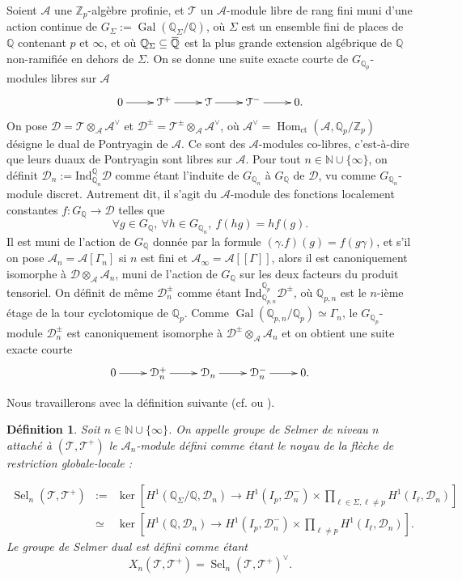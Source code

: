 \documentclass[12pt]{amsart}
\newcommand\bN{\mathbb{N}}
\newcommand\bQ{\mathbb{Q}}
\newcommand\Zp{{\mathbb{Z}_{p}}}
\newcommand\Qp{\mathbb{Q}_{p}}
\newcommand\cA{\mathcal{A}}
\newcommand\cD{\mathcal{D}}
\newcommand\cT{\mathcal{T}}
\newcommand{\ob}[1]{\mkern 1.5mu\overline{\mkern-1.5mu#1\mkern-1.5mu}\mkern 1.5mu}
\newcommand{\Ind}{\mathrm{Ind}}
\DeclareMathOperator{\Gal}{Gal}
\DeclareMathOperator{\Hom}{Hom}
\DeclareMathOperator{\Sel}{Sel}
\theoremstyle{defstyle}
\newtheorem{definition}[subsubsection]{Définition}
\theoremstyle{thmstyle}
\begin{document}
Soient $\cA$ une $\Zp$-algèbre profinie, et $\cT$ un $\cA$-module libre de rang fini muni d'une action continue de $G_\Sigma:=\Gal(\bQ_\Sigma/\bQ)$, où $\Sigma$ est un ensemble fini de places de $\bQ$ contenant $p$ et $\infty$, et où $\bQ_\Sigma \subseteq \ob{\bQ}$ est la plus grande extension algébrique de $\bQ$ non-ramifiée en dehors de $\Sigma$. On se donne une suite exacte courte de $G_{\Qp}$-modules libres sur $\cA$
$$\xymatrix{
	0 \ar[r] & \cT^+ \ar[r] & \cT \ar[r] & \cT^- \ar[r] & 0.
}
$$
On pose $\cD=\cT \otimes_{\cA} {\cA}^\vee$ et $\cD^\pm = \cT^\pm \otimes_{\cA} {\cA}^\vee$, où $\cA^\vee=\Hom_\textrm{ct}(\cA,\Qp/\Zp)$ désigne le dual de Pontryagin de $\cA$. Ce sont des $\cA$-modules co-libres, c'est-à-dire que leurs duaux de Pontryagin sont libres sur $\cA$. Pour tout $n \in \bN \cup\{\infty\}$, on définit $\cD_n:=\Ind_{{\bQ_n}}^{{\bQ}} \cD$ comme étant l'induite de $G_{\bQ_n}$ à $G_{\bQ}$ de $\cD$, vu comme $G_{\bQ_n}$-module discret. Autrement dit, il s'agit du $\cA$-module des fonctions localement constantes $f : G_{\bQ} \longrightarrow \cD$ telles que 
$$\forall g\in G_{\bQ}, \ \forall h \in G_{\bQ_n}, \ f(hg)=hf(g).$$ 
Il est muni de l'action de $G_{\bQ}$ donnée par la formule $(\gamma.f)(g)=f(g\gamma)$, et s'il on pose $\cA_n=\cA[\Gamma_n]$ si $n$ est fini et $\cA_\infty=\cA[[\Gamma]]$, alors il est canoniquement isomorphe à $\cD \otimes_{\cA} \cA_n$, muni de l'action de $G_{\bQ}$ sur les deux facteurs du produit tensoriel. On définit de même $\cD_n^\pm$ comme étant $\Ind_{{\bQ_{p,n}}}^{{\bQ_p}} \cD^\pm$, où $\bQ_{p,n}$ est le $n$-ième étage de la tour cyclotomique de $\Qp$. Comme $\Gal(\bQ_{p,n}/\Qp)\simeq\Gamma_n$, le $G_{\Qp}$-module $\cD_n^\pm$ est canoniquement isomorphe à $\cD^\pm \otimes_{\cA} \cA_n$ et on obtient une suite exacte courte
$$\xymatrix{
	0 \ar[r] & \cD_n^+ \ar[r] & \cD_n \ar[r] & \cD_n^- \ar[r] & 0.
}
$$

Nous travaillerons avec la définition suivante (cf. \cite[Section 3]{skinner2014iwasawa} ou \cite{greenberg2015structure}).

\begin{definition}\label{Selgen}
	Soit $n\in \bN \cup\{\infty\}$. On appelle groupe de Selmer de niveau $n$ attaché à $(\cT,\cT^+)$ le $\cA_n$-module défini comme étant le noyau de la flèche de restriction globale-locale : 
	
	\[\begin{array}{rcl} \Sel_n(\cT,\cT^+)
	&:=&\ker \left[ H^1(\bQ_\Sigma/\bQ,\cD_n) \longrightarrow H^1(I_{p},\cD_n^-) \times \prod_{\ell \in \Sigma, \ell\neq p} H^1(I_{\ell},\cD_n)  \right] \\
	&\simeq& \ker \left[ H^1(\bQ,\cD_n) \longrightarrow H^1(I_{p},\cD_n^-) \times \prod_{\ell\neq p} H^1(I_{\ell},\cD_n)  \right].\end{array}\]
	Le groupe de Selmer dual est défini comme étant $$X_n(\cT,\cT^+)=\Sel_n(\cT,\cT^+)^\vee.$$
\end{definition}
\end{document}
